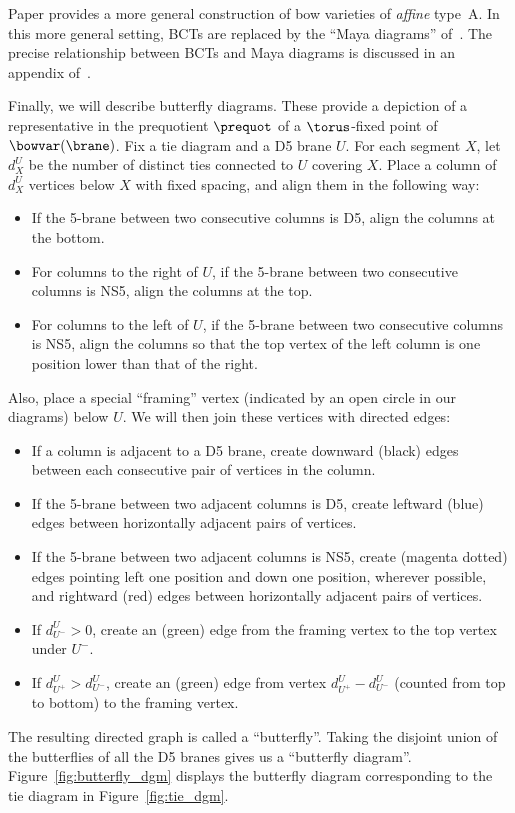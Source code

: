 \begin{Remark}
Paper \cite{NT} provides a more general construction of bow varieties of \emph{affine} type~A. In this more general setting, BCTs are replaced by the ``Maya diagrams'' of~\cite{N_satake}. The precise relationship between BCTs and Maya diagrams is discussed in an appendix of~\cite{RS}.
\end{Remark}

Finally, we will describe butterfly diagrams. These provide a depiction of a representative in the prequotient $\prequot$ of a $\torus$-fixed point of $\bowvar(\brane)$. Fix a tie diagram and a D5 brane $U$. For each segment $X$, let $d_X^U$ be the number of distinct ties connected to $U$ covering $X$. Place a column of $d_X^U$ vertices below $X$ with fixed spacing, and align them in the following way:
\begin{itemize}\itemsep=0pt
\item If the 5-brane between two consecutive columns is D5, align the columns at the bottom.
\item For columns to the right of $U$, if the 5-brane between two consecutive columns is NS5, align the columns at the top.
\item For columns to the left of $U$, if the 5-brane between two consecutive columns is NS5, align the columns so that the top vertex of the left column is one position lower than that of the right.
\end{itemize}
Also, place a special ``framing'' vertex (indicated by an open circle in our diagrams) below $U$. We will then join these vertices with directed edges:
\begin{itemize}\itemsep=0pt
\item If a column is adjacent to a D5 brane, create downward (black) edges between each consecutive pair of vertices in the column.
\item If the 5-brane between two adjacent columns is D5, create leftward (blue) edges between horizontally adjacent pairs of vertices.
\item If the 5-brane between two adjacent columns is NS5, create (magenta dotted) edges pointing left one position and down one position, wherever possible, and rightward (red) edges between horizontally adjacent pairs of vertices.
\item If $d_{U^-}^U > 0$, create an (green) edge from the framing vertex to the top vertex under $U^-$.
\item If $d_{U^+}^U > d_{U^-}^U$, create an (green) edge from vertex $d_{U^+}^U - d_{U^-}^U$ (counted from top to bottom) to the framing vertex.
\end{itemize}
The resulting directed graph is called a ``butterfly''. Taking the disjoint union of the butterflies of all the D5 branes gives us a ``butterfly diagram''. Figure~\ref{fig:butterfly_dgm} displays the butterfly diagram corresponding to the tie diagram in Figure~\ref{fig:tie_dgm}.

